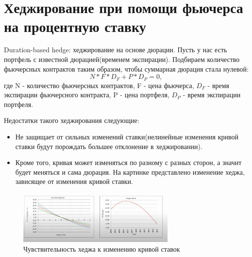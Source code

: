 \documentclass{article}
\begin{document}
\section{Хеджирование при помощи фьючерса на процентную ставку}
Duration-based hedge: хеджирование на основе дюрации.
Пусть у нас есть портфель с известной дюрацией(временем экспирации). Подбираем количество фьючерсных контрактов таким образом, чтобы суммарная дюрация стала нулевой:
$$N*F*D_{F} + P*D_{P} = 0,$$
где N - количество фьючерсных контрактов, F - цена фьючерса, $D_F$ - время экспирации фьючерсного контракта, P - цена портфеля, $D_P$ - время экспирации портфеля.

Недостатки такого хеджирования следующие:

\begin{itemize}
\item Не защищает от сильных изменений ставки(нелинейные изменения кривой ставки будут порождать большее отклонение в хеджировании).
\item Кроме того, кривая может изменяться по разному с разных сторон, а значит будет меняться и сама дюрация. На картинке представлено изменение хеджа, зависящее от изменения кривой ставки.
\end{itemize}

\begin{figure}[h]
\centering
\includegraphics[width=0.7\textwidth]{yield_ch.png}
\caption{Чувствительность хеджа к изменению кривой ставок}
\label{loadings}
\end{figure}
\end{document}
